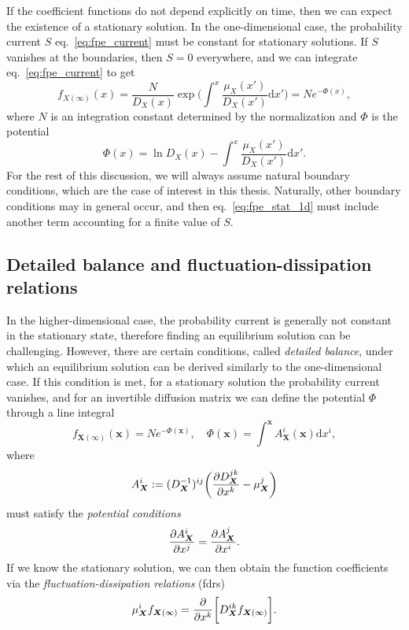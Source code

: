 \documentclass[a4paper,12pt]{book}
\begin{document}
If the coefficient functions do not depend explicitly on time, then we can expect the existence of a stationary solution. In the one-dimensional case, the probability current $S$ eq.~\eqref{eq:fpe_current} must be constant for stationary solutions. If $S$ vanishes at the boundaries, then $S=0$ everywhere, and we can integrate eq.~\eqref{eq:fpe_current} to get
\begin{equation}
    \label{eq:fpe_stat_1d}
    f_{X(\infty)}(x) = \frac{N}{D_X(x)} \exp \biggl( \int^x \frac{\mu_X(x')}{D_X(x')} \mathrm{d}x'  \biggr) = N e^{-\Phi(x)}, 
\end{equation}
where $N$ is an integration constant determined by the normalization and $\Phi$ is the potential 
\begin{equation}
    \label{eq:fpp_1d}
    \Phi(x) = \ln D_X(x) - \int^x \frac{\mu_X(x')}{D_X(x')} \mathrm{d}x'.
\end{equation}
For the rest of this discussion, we will always assume natural boundary conditions, which are the case of interest in this thesis. Naturally, other boundary conditions may in general occur, and then eq.~\eqref{eq:fpe_stat_1d} must include another term accounting for a finite value of $S$. 

\subsection{Detailed balance and fluctuation-dissipation relations}
In the higher-dimensional case, the probability current is generally not constant in the stationary state, therefore finding an equilibrium solution can be challenging. However, there are certain conditions, called \textit{detailed balance}, under which an equilibrium solution can be derived similarly to the one-dimensional case. If this condition is met, for a stationary solution the probability current vanishes, and for an invertible diffusion matrix we can define the potential $\Phi$ through a line integral
\begin{equation}
    f_{\bm{X}(\infty)}(\bm{x}) = N e^{-\Phi(\bm{x})}, \quad \Phi(\bm{x}) = \int^{\bm{x}} A_{\bm{X}}^i(\bm{x}) \mathrm{d}x^i, 
\end{equation}
where 
\begin{equation}
    A_{\bm{X}}^i := (D^{-1}_{\bm{X}})^{ij}\biggl( \pdv{D_{\bm{X}}^{jk}}{x^k} - \mu_{\bm{X}}^j \biggr)
\end{equation}
must satisfy the \textit{potential conditions}
\begin{equation}
    \pdv{A_{\bm{X}}^i}{x^j} = \pdv{A_{\bm{X}}^j}{x^i}.
\end{equation}
If we know the stationary solution, we can then obtain the function coefficients via the \textit{fluctuation-dissipation relations} (\acrshort{fdr}s)
\begin{equation}
\label{eq:fdr}
    \mu_{\bm{X}}^i f_{\bm{X}(\infty)}= \pdv{}{x^k} \biggl[ D_{\bm{X}}^{ik} f_{\bm{X}(\infty)}\biggr].
\end{equation}
\end{document}
